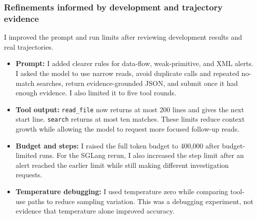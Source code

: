 \documentclass[11pt]{article}
\begin{document}
\subsubsection*{Refinements informed by development and trajectory evidence}
I improved the prompt and run limits after reviewing development results and real trajectories.

\begin{itemize}
  \item \textbf{Prompt:} I added clearer rules for data-flow, weak-primitive, and XML alerts. I asked the model to use narrow reads, avoid duplicate calls and repeated no-match searches, return evidence-grounded JSON, and submit once it had enough evidence. I also limited it to five tool rounds.

  \item \textbf{Tool output:} \texttt{read\_file} now returns at most 200 lines and gives the next start line. \texttt{search} returns at most ten matches. These limits reduce context growth while allowing the model to request more focused follow-up reads.
  \item \textbf{Budget and steps:} I raised the full token budget to 400,000 after budget-limited runs. For the SGLang rerun, I also increased the step limit after an alert reached the earlier limit while still making different investigation requests.
  \item \textbf{Temperature debugging:} I used temperature zero while comparing tool-use paths to reduce sampling variation. This was a debugging experiment, not evidence that temperature alone improved accuracy.
\end{itemize}

\clearpage
\end{document}
